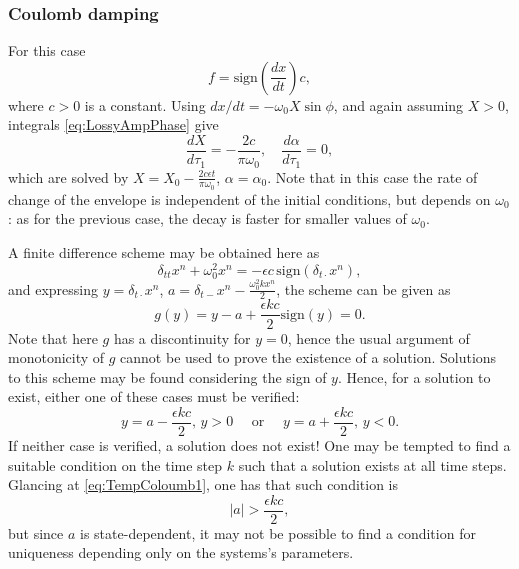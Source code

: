 \documentclass[11pt,twoside,a4paper,english]{book}
\newcommand{\dtm}{\delta_{t-}}
\newcommand{\dtd}{\delta_{t\cdot}}
\newcommand{\dtt}{\delta_{tt}}
\begin{document}
\subsubsection{Coulomb damping}

For this case
\begin{equation}
f = \text{sign}\left( \frac{dx}{dt} \right)c,
\end{equation}
where $c>0$ is a constant. Using $dx/dt = -\omega_0X\sin\phi$, and again assuming $X>0$, integrals \eqref{eq:LossyAmpPhase} give
\begin{equation}
\frac{dX}{d\tau_1} = -\frac{2c}{\pi \omega_0}, \quad \frac{d \alpha}{d\tau_1} = 0,
\end{equation}
which are solved by $X=X_0-\frac{2c\epsilon  t}{\pi \omega_0}$, $\alpha = \alpha_0$. Note that in this case the rate of change of the envelope is independent of the initial  conditions, but depends on $\omega_0$: as for the previous case, the decay is faster for smaller values of $\omega_0$.


A finite difference scheme may be obtained here as
\begin{equation}
\dtt x^n + \omega_0^2 x^n = -\epsilon c \, \text{sign}(\dtd x^n), 
\end{equation}
and expressing $y = \dtd x^n$, $a = \dtm x^n - \frac{\omega_0^2 k x^n}{2}$, the scheme can be given as
\begin{equation}
g(y) = y - a + \frac{\epsilon k c}{2}\text{sign}(y)=0.
\end{equation}
Note that here $g$ has a discontinuity for $y=0$, hence the usual argument of monotonicity of $g$ cannot be used to prove the existence of a solution. Solutions to this scheme may be found considering the sign of $y$. Hence, for a solution to exist, either one of these cases must be verified:
\begin{equation}\label{eq:TempColoumb1}
y = a - \frac{\epsilon k c}{2},\, y>0 \quad \text{ or } \quad y = a + \frac{\epsilon k c}{2},\, y<0.
\end{equation}
If neither case is verified, a solution does not exist! One may be tempted to find a suitable condition on the time step $k$ such that a solution exists at all time steps. Glancing at \ref{eq:TempColoumb1}, one has that such condition is
\begin{equation}
|a|>\frac{\epsilon k c}{2},
\end{equation}
but since $a$ is state-dependent, it may not be possible to find a condition for uniqueness depending only on the systems's parameters. 
\end{document}
